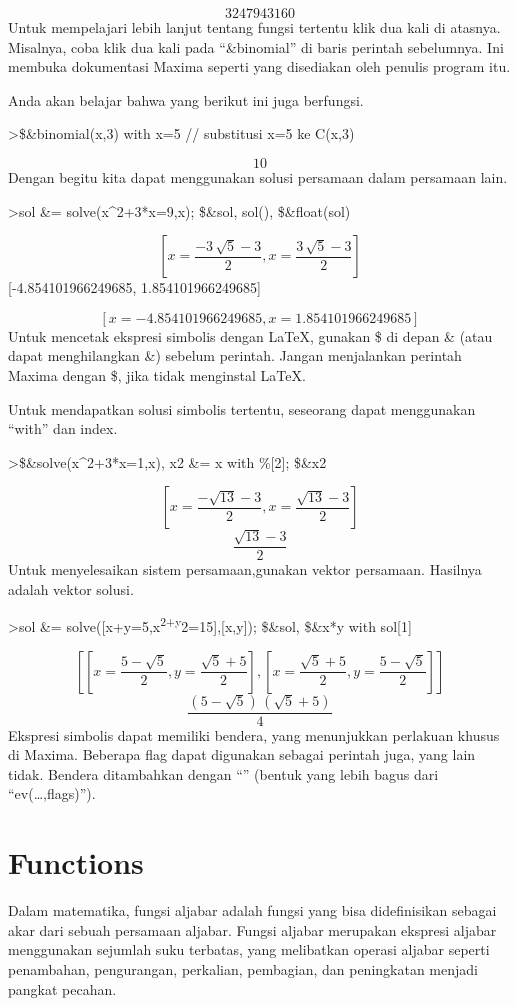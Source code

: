 \documentclass[
]{book}
\begin{document}
\[3247943160\]Untuk mempelajari lebih lanjut tentang fungsi tertentu klik dua kali di atasnya. Misalnya, coba klik dua kali pada ``\&binomial'' di baris perintah sebelumnya. Ini membuka dokumentasi Maxima seperti yang disediakan oleh penulis program itu.

Anda akan belajar bahwa yang berikut ini juga berfungsi.

\textgreater\$\&binomial(x,3) with x=5 // substitusi x=5 ke C(x,3)

\[10\]Dengan begitu kita dapat menggunakan solusi persamaan dalam persamaan lain.

\textgreater sol \&= solve(x\^{}2+3*x=9,x); \$\&sol, sol(), \$\&float(sol)

\[\left[ x=\frac{-3\,\sqrt{5}-3}{2} , x=\frac{3\,\sqrt{5}-3}{2}
  \right] \] {[}-4.854101966249685, 1.854101966249685{]}

\[\left[ x=-4.854101966249685 , x=1.854101966249685 \right] \]Untuk mencetak ekspresi simbolis dengan LaTeX, gunakan \$ di depan \& (atau dapat menghilangkan \&) sebelum perintah. Jangan menjalankan perintah Maxima dengan \$, jika tidak menginstal LaTeX.

Untuk mendapatkan solusi simbolis tertentu, seseorang dapat menggunakan ``with'' dan index.

\textgreater\$\&solve(x\^{}2+3*x=1,x), x2 \&= x with \%{[}2{]}; \$\&x2

\[\left[ x=\frac{-\sqrt{13}-3}{2} , x=\frac{\sqrt{13}-3}{2} \right] \]\[\frac{\sqrt{13}-3}{2}\]Untuk menyelesaikan sistem persamaan,gunakan vektor persamaan. Hasilnya adalah vektor solusi.

\textgreater sol \&= solve({[}x+y=5,x\textsuperscript{2+y}2=15{]},{[}x,y{]}); \$\&sol, \$\&x*y with sol{[}1{]}

\[\left[ \left[ x=\frac{5-\sqrt{5}}{2} , y=\frac{\sqrt{5}+5}{2}
  \right]  , \left[ x=\frac{\sqrt{5}+5}{2} , y=\frac{5-\sqrt{5}}{2}
  \right]  \right] \]\[\frac{\left(5-\sqrt{5}\right)\,\left(\sqrt{5}+5\right)}{4}\]Ekspresi simbolis dapat memiliki bendera, yang menunjukkan perlakuan khusus di Maxima. Beberapa flag dapat digunakan sebagai perintah juga, yang lain tidak. Bendera ditambahkan dengan ``\textbar{}'' (bentuk yang lebih bagus dari ``ev(\ldots,flags)'').

\section{Functions}\label{functions}

Dalam matematika, fungsi aljabar adalah fungsi yang bisa didefinisikan sebagai akar dari sebuah persamaan aljabar. Fungsi aljabar merupakan ekspresi aljabar menggunakan sejumlah suku terbatas, yang melibatkan operasi aljabar seperti penambahan, pengurangan, perkalian, pembagian, dan peningkatan menjadi pangkat pecahan.
\end{document}
